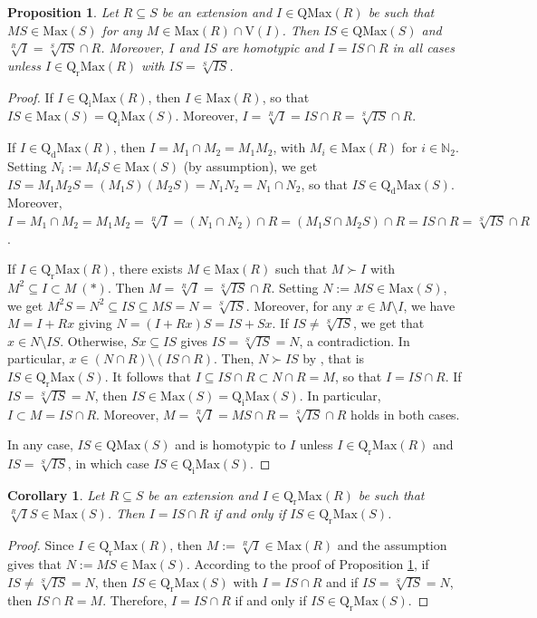 \documentclass[12pt,leqno]{amsart}
\newtheorem{proposition}[theorem]{Proposition}
\newtheorem{corollary}[theorem]{Corollary}
\theoremstyle{definition}
\begin{document}
\begin{proposition}\label{3.28} Let $R\subseteq S$ be an extension and $I\in\mathrm{QMax}(R)$ be such that $MS\in\mathrm{Max}(S)$ for any $M\in\mathrm{Max}(R)\cap\mathrm{V}(I)$. Then $IS\in\mathrm{QMax}(S)$ and $\sqrt [R]I=\sqrt[S]{IS}\cap R$. Moreover, $I$ and $IS$ are homotypic 
 and $I=IS\cap R$ in all cases unless $I\in\mathrm{Q_rMax}(R)$ with $IS=\sqrt[S]{IS}$. 
\end{proposition}
\begin{proof} If $I\in\mathrm{Q_iMax}(R)$, then $I\in\mathrm{Max}(R)$, so that $IS\in\mathrm{Max}(S)=\mathrm{Q_iMax}(S)$. Moreover, $I=\sqrt[R]I=IS\cap R=\sqrt[S]{IS}\cap R$.

If $I\in\mathrm{Q_dMax}(R)$, then $I=M_1\cap M_2=M_1M_2$, with $M_i\in\mathrm{Max}(R)$ for $i\in\mathbb N_2$. Setting $N_i:=M_iS\in\mathrm {Max}(S)$ (by assumption), we get $IS=M_1M_2S=(M_1S)(M_2S)=N_1 N_2=N_1\cap N_2$, so that $IS\in\mathrm{Q_dMax}(S)$. Moreover, $I= M_1\cap M_2=M_1M_2=\sqrt[R]I=(N_1\cap N_2)\cap R=(M_1S\cap M_2S)\cap R=IS\cap R=\sqrt[S]{IS}\cap R$.

If $I\in\mathrm{Q_rMax}(R)$, there exists $M\in\mathrm{Max}(R)$ such that $M\succ I$ with $M^2\subseteq I\subset M\ (*)$. Then $M=\sqrt[R]I=\sqrt[S]{IS}\cap R$. Setting $N:=MS\in\mathrm{Max}(S)$, we get $M^2S= N^2\subseteq IS\subseteq MS=N=\sqrt[S]{IS}$. Moreover, for any $x\in M\setminus I$, we have $M=I+Rx$ giving $N=(I+Rx)S=IS+Sx$. If $IS\neq\sqrt[S]{IS}$, we get that $x\in N\setminus IS$. Otherwise, $Sx\subseteq IS$ gives $IS=\sqrt[S]{IS}=N$, a contradiction. In particular, $x\in(N\cap R) \setminus(IS\cap R)$. Then, $N\succ IS$ by \cite[Corollary 2, p.237]{ZS}, that is $IS\in\mathrm{Q_rMax}(S)$. It follows that $I\subseteq IS\cap R\subset N\cap R=M$, so that $I=IS\cap R$. If $IS=\sqrt[S]{IS}=N$, then $IS\in\mathrm{Max}(S)=\mathrm{Q_iMax}(S)$. In particular, $I\subset M=IS\cap R$. Moreover, $M=\sqrt[R]I=MS\cap R=\sqrt[S]{IS}\cap R$ holds in both cases.

In any case, $IS\in\mathrm{QMax}(S)$ and is homotypic to $I$ unless $I\in\mathrm{Q_rMax}(R)$ and $IS=\sqrt[S]{IS}$, in which case $IS\in\mathrm {Q_iMax}(S)$. 
\end{proof}

\begin{corollary}\label{3.2} Let $R\subseteq S$ be an extension and $I\in \mathrm{Q_rMax}(R)$ be such that $\sqrt[R]IS\in\mathrm{Max}(S)$. Then $I=IS\cap R$ if and only if $IS\in\mathrm {Q_rMax}(S)$. 
\end{corollary}
\begin{proof} Since $I\in\mathrm{Q_rMax}(R)$, then $M:=\sqrt[R]I\in\mathrm{Max}(R)$ and the assumption gives that $N:=MS\in\mathrm{Max}(S)$.  According to the proof of Proposition \ref{3.28}, if $IS\neq\sqrt[S]{IS}=N$, then $IS\in\mathrm{Q_rMax}(S)$ with $I=IS\cap R$ and if $IS=\sqrt [S]{IS}=N$, then $IS\cap R=M$. Therefore, $I=IS\cap R$ if and only if $IS\in\mathrm{Q_rMax}(S)$. 
\end{proof}
\end{document}
